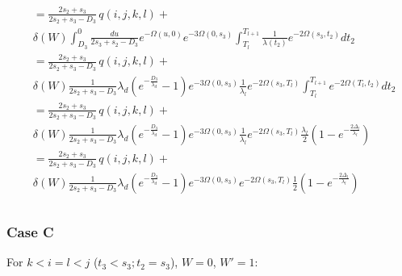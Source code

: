 \documentclass{article}
\begin{document}
\begin{align}
    \begin{split}
        &= \frac{2s_2+s_3}{2s_2+s_3-D_3}\,q(i,j,k,l) +\\
        &\delta(W)\int_{D_3}^{0}\frac{du}{2s_3+s_2-D_3}e^{-\Omega(u,0)}e^{-3\Omega(0,s_3)}\int_{T_l}^{T_{l+1}}\frac{1}{\lambda(t_2)}e^{-2\Omega(s_3,t_2)}dt_2\\
        &= \frac{2s_2+s_3}{2s_2+s_3-D_3}\,q(i,j,k,l) +\\
        &\delta(W)\frac{1}{2s_2+s_3-D_3}
        \lambda_d\left(e^{-\frac{D_3}{\lambda_d}}-1\right)
        e^{-3\Omega(0,s_3)}\frac{1}{\lambda_l}e^{-2\Omega(s_3,T_l)}\int_{T_l}^{T_{l+1}}e^{-2\Omega(T_l,t_2)}dt_2\\
        &= \frac{2s_2+s_3}{2s_2+s_3-D_3}\,q(i,j,k,l) +\\
        &\delta(W)\frac{1}{2s_2+s_3-D_3}
        \lambda_d\left(e^{-\frac{D_3}{\lambda_d}}-1\right)
        e^{-3\Omega(0,s_3)}\frac{1}{\lambda_l}e^{-2\Omega(s_3,T_l)}\frac{\lambda_l}{2}\left(1-e^{-\frac{2\Delta_l}{\lambda_l}}\right)\\
        &= \frac{2s_2+s_3}{2s_2+s_3-D_3}\,q(i,j,k,l) +\\
        &\delta(W)\frac{1}{2s_2+s_3-D_3}
        \lambda_d\left(e^{-\frac{D_3}{\lambda_d}}-1\right)
        e^{-3\Omega(0,s_3)}e^{-2\Omega(s_3,T_l)}\frac{1}{2}\left(1-e^{-\frac{2\Delta_l}{\lambda_l}}\right)\\
    \end{split}
\end{align}

\subsubsection{Case C}
For $k<i=l<j$ ($t_3<s_3; t_2=s_3$), $W = 0$, $W' = 1$:
\end{document}
